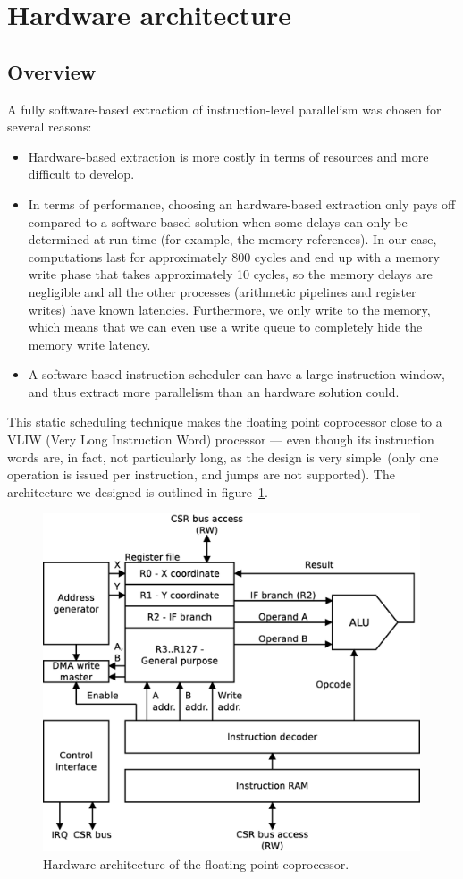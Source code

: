 \documentclass[a4paper,11pt]{kthesis}
\begin{document}
\section{Hardware architecture}
\subsection{Overview}
A fully software-based extraction of instruction-level parallelism was chosen for several reasons:
\begin{itemize}
\item Hardware-based extraction is more costly in terms of resources and more difficult to develop.
\item In terms of performance, choosing an hardware-based extraction only pays off compared to a software-based solution when some delays can only be determined at run-time (for example, the memory references). In our case, computations last for approximately 800 cycles and end up with a memory write phase that takes approximately 10 cycles, so the memory delays are negligible and all the other processes (arithmetic pipelines and register writes) have known latencies. Furthermore, we only write to the memory, which means that we can even use a write queue to completely hide the memory write latency.
\item A software-based instruction scheduler can have a large instruction window, and thus extract more parallelism than an hardware solution could.
\end{itemize}

This static scheduling technique makes the floating point coprocessor close to a VLIW (Very Long Instruction Word) processor --- even though its instruction words are, in fact, not particularly long, as the design is very simple (only one operation is issued per instruction, and jumps are not supported). The architecture we designed is outlined in figure~\ref{fig:pfpuarch}.

\begin{figure}[htp]
\centering
\includegraphics[height=100mm]{pfpu_architecture.eps}
\caption{Hardware architecture of the floating point coprocessor.}
\label{fig:pfpuarch}
\end{figure}
\end{document}
